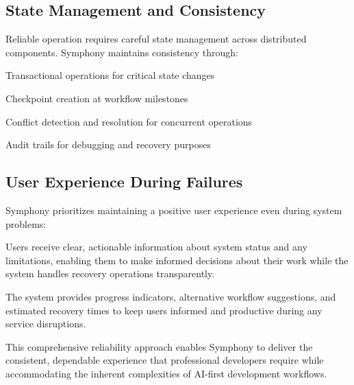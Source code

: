 \subsection*{State Management and Consistency}

Reliable operation requires careful state management across distributed components. Symphony maintains consistency through:

\begin{compactlist}
    \item Transactional operations for critical state changes
    \item Checkpoint creation at workflow milestones
    \item Conflict detection and resolution for concurrent operations
    \item Audit trails for debugging and recovery purposes
\end{compactlist}

\subsection*{User Experience During Failures}

Symphony prioritizes maintaining a positive user experience even during system problems:

\begin{alertbox}
Users receive clear, actionable information about system status and any limitations, enabling them to make informed decisions about their work while the system handles recovery operations transparently.
\end{alertbox}

The system provides progress indicators, alternative workflow suggestions, and estimated recovery times to keep users informed and productive during any service disruptions.

This comprehensive reliability approach enables Symphony to deliver the consistent, dependable experience that professional developers require while accommodating the inherent complexities of AI-first development workflows.
